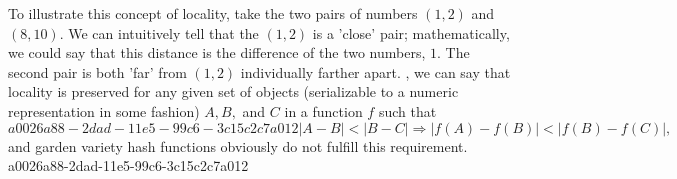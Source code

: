\documentclass[12pt]{article}
\begin{document}
\par To illustrate this concept of locality, take the two pairs of numbers $(1,2)$ and $(8,10)$. We can intuitively tell that the $(1,2)$ is a 'close' pair; mathematically, we could say that this distance is the difference of the two numbers, $1$. The second pair is both 'far' from $(1,2)$ individually farther apart. , we can say that locality is preserved for any given set of objects (serializable to a numeric representation in some fashion) $A,B,$ and $C$ in a function $f$ such that
\begin{equation}
a0026a88-2dad-11e5-99c6-3c15c2c7a012|A-B| < |B-C| \Rightarrow |f(A)-f(B)| < |f(B) - f(C)|,
\end{equation}
and garden variety hash functions obviously do not fulfill this requirement.
a0026a88-2dad-11e5-99c6-3c15c2c7a012
\printbibliography
\end{document}
